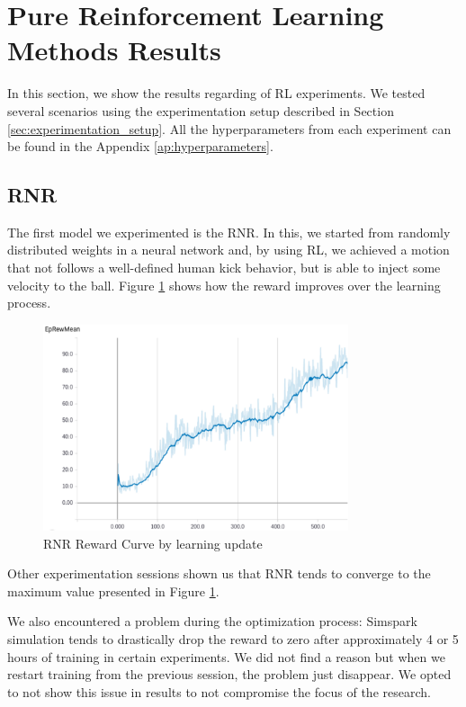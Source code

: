 \section{Pure Reinforcement Learning Methods Results}

In this section, we show the results regarding of RL experiments. We tested several scenarios using the experimentation setup described in Section \ref{sec:experimentation_setup}. All the hyperparameters from each experiment can be found in the Appendix \ref{ap:hyperparameters}.

\subsection{RNR}\label{sec:rnr}

The first model we experimented is the RNR. In this, we started from randomly distributed weights in a neural network and, by using RL, we achieved a motion that not follows a well-defined human kick behavior, but is able to inject some velocity to the ball. Figure \ref{fig:rnrreward} shows how the reward improves over the learning process.

\begin{figure}[!htbp]
	\centering
	\includegraphics[width=0.8\textwidth]{Cap6/rnrreward.eps}
	\caption{RNR Reward Curve by learning update}
	\label{fig:rnrreward}
\end{figure}

Other experimentation sessions shown us that RNR tends to converge to the maximum value presented in Figure \ref{fig:rnrreward}.

We also encountered a problem during the optimization process: Simspark simulation tends to drastically drop the reward to zero after approximately 4 or 5 hours of training in certain experiments. We did not find a reason but when we restart training from the previous session, the problem just disappear. We opted to not show this issue in results to not compromise the focus of the research.

